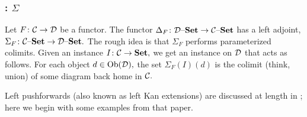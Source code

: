 \documentclass[CT4S-EN-RU]{subfiles}
\begin{document}

\subsubsection{: \texorpdfstring{$\Sigma$}{Σ}}\label{sec:left push}

\begin{blockENG}
Let $F\colon\mathcal{C}\rightarrow\mathcal{D}$ be a functor. The functor $\Delta_F\colon\mathcal{D}{\text \textendash}{\mathbf{Set}}\rightarrow\mathcal{C}{\text \textendash}{\mathbf{Set}}$ has a left adjoint, $\Sigma_F\colon\mathcal{C}{\text \textendash}{\mathbf{Set}}\rightarrow\mathcal{D}{\text \textendash}{\mathbf{Set}}.$ The rough idea is that $\Sigma_F$ performs parameterized colimits. Given an instance $I\colon\mathcal{C}\rightarrow{\mathbf{Set}},$ we get an instance on $\mathcal{D}$ that acts as follows. For each object $d\in\operatorname{Ob}(\mathcal{D}),$ the set $\Sigma_F(I)(d)$ is the colimit (think, union) of some diagram back home in $\mathcal{C}.$ 
\end{blockENG}

\begin{blockRUS}
\end{blockRUS}

\begin{blockENG}
Left pushforwards (also known as left Kan extensions) are discussed at length in \cite{Sp1}; here we begin with some examples from that paper.
\end{blockENG}

\begin{blockRUS}
\end{blockRUS}
\end{document}
